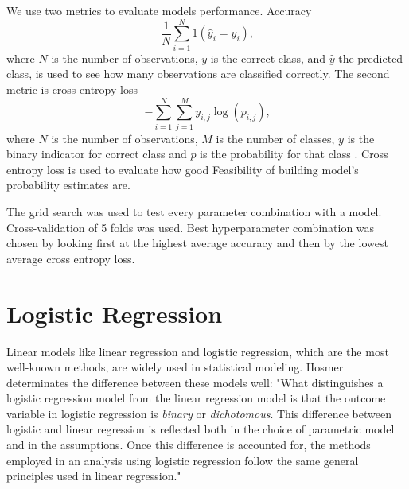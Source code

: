 We use two metrics to evaluate models performance. Accuracy
\begin{equation}
    \frac { 1 } { N} \sum _ { i = 1 } ^ {N} 1 \left( \hat { y } _ { i } = y _ { i } \right)\text{,}
\end{equation}
where $N$ is the number of observations, $y$ is the correct class, and $\hat { y }$ the predicted class, is used to see how many observations are classified correctly. The second metric is cross entropy loss
\begin{equation}
    - \sum _ { i = 1 } ^ { N }\sum _ { j = 1 } ^ { M } y _ { i,j } \log \left( p _ { i,j } \right) \text{,}
\end{equation}
where $N$ is the number of observations, $M$ is the number of classes, $y$ is the binary indicator for correct class and $p$ is the probability for that class \cite{nasrabadi2007pattern}. Cross entropy loss is used to evaluate how good Feasibility of building model's probability estimates are.

The grid search was used to test every parameter combination with a model. Cross-validation of 5 folds was used. Best hyperparameter combination was chosen by looking first at the highest average accuracy and then by the lowest average cross entropy loss.

\section{Logistic Regression}
Linear models like linear regression and logistic regression, which are the most well-known methods, are widely used in statistical modeling. Hosmer\cite{hosmer2013applied} determinates the difference between these models well: "What distinguishes a logistic regression model from the linear regression model is that the outcome variable in logistic regression is \textit{binary} or \textit{dichotomous}. This difference between logistic and linear regression is reflected both in the choice of parametric model and in the assumptions. Once this difference is accounted for, the methods employed in an analysis using logistic regression follow the same general principles used in linear regression."

